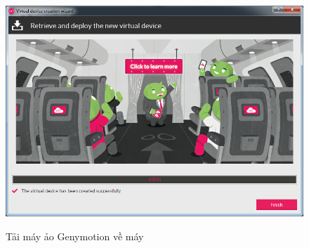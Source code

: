 \documentclass[13pt,a4paper]{extreport}
\begin{document}
\begin{itemize}
\begin{itemize}
\begin{figure}[!h]
\begin{center}
									{\includegraphics[scale=.3]{setup-genymotion-28}}\\								
							\end{center}
							\caption{Tải máy ảo Genymotion về máy}
							\label{Fig:download-virtual-devices}
							\vspace{-.5cm}
						\end{figure}
					

\end{itemize}
\end{itemize}
\end{document}

